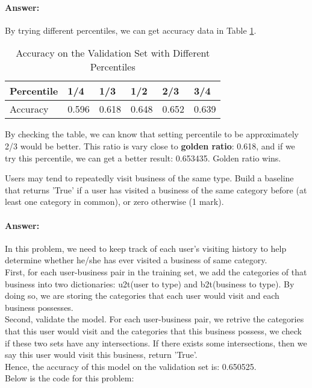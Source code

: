 \documentclass{assignment}
\begin{document}
\begin{problemlist}
\paragraph{Answer:}
\par
By trying different percentiles, we can get accuracy data in Table \ref{table:percentile}.
\begin{table}[!hbp]
\centering
\caption{Accuracy on the Validation Set with Different Percentiles} 
\begin{tabular}{p{2cm}<{\centering}|p{2cm}<{\centering} p{2cm}<{\centering} p{2cm}<{\centering} p{2cm}<{\centering} p{2cm}<{\centering}}
\hline
Percentile & 1/4  & 1/3  &  1/2  &  2/3  &  3/4  \\  
\hline
Accuracy  & 0.596 & 0.618  &  0.648  &   0.652  &   0.639 \\  
\hline
\end{tabular}
\label{table:percentile}
\end{table} 

By checking the table, we can know that setting percentile to be approximately 2/3 would be better. This ratio is vary close to \textbf{golden ratio}: 0.618, and if we try this percentile, we can get a better result: 0.653435. Golden ratio wins.

\newpage


\pbitem
Users may tend to repeatedly visit business of the same type. Build a baseline that returns 'True' if a user has visited a business of the same category before (at least one category in common), or zero otherwise (1 mark).

\paragraph{Answer:}
In this problem, we need to keep track of each user's visiting history to help determine whether he/she has ever visited a business of same category. \\
First, for each user-business pair in the training set, we add the categories of that business into two dictionaries: u2t(user to type) and b2t(business to type). By doing so, we are storing the categories that each user would visit and each business possesses.\\
Second, validate the model. For each user-business pair, we retrive the categories that this user would visit and the categories that this business possess, we check if these two sets have any intersections. If there exists some intersections, then we say this user would visit this business, return 'True'.\\
Hence, the accuracy of this model on the validation set is: 0.650525.\\
Below is the code for this problem:


\end{problemlist}
\end{document}
